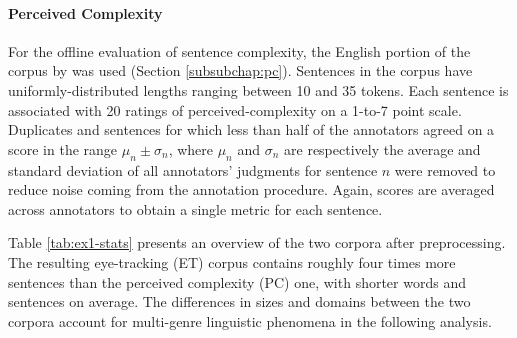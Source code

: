 \documentclass[a4paper, nobind]{templates/ociamthesis}
\begin{document}
\paragraph{Perceived Complexity} For the offline evaluation of sentence complexity, the English portion of the corpus by \textcite{brunato-etal-2018-sentence} was used (Section \ref{subsubchap:pc}). Sentences in the corpus have uniformly-distributed lengths ranging between 10 and 35 tokens. Each sentence is associated with 20 ratings of perceived-complexity on a 1-to-7 point scale. Duplicates and sentences for which less than half of the annotators agreed on a score in the range \(\mu_n \pm \sigma_n\), where \(\mu_n\) and \(\sigma_n\) are respectively the average and standard deviation of all annotators' judgments for sentence \(n\) were removed to reduce noise coming from the annotation procedure. Again, scores are averaged across annotators to obtain a single metric for each sentence.

Table \ref{tab:ex1-stats} presents an overview of the two corpora after preprocessing. The resulting eye-tracking (ET) corpus contains roughly four times more sentences than the perceived complexity (PC) one, with shorter words and sentences on average. The differences in sizes and domains between the two corpora account for multi-genre linguistic phenomena in the following analysis.
\end{document}
